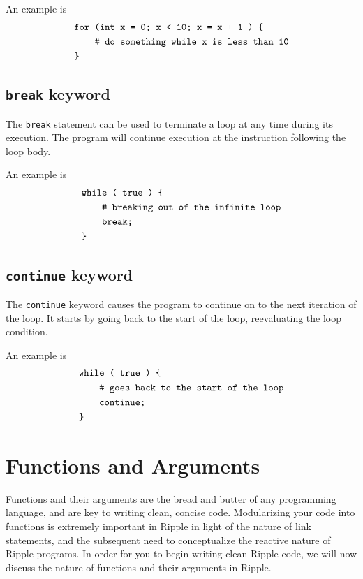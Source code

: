 \documentclass{article}
\newcommand{\code}{\texttt}
\begin{document}
An example is
\begin{align*}
&\code{for (int x = 0; x < 10; x = x + 1 ) \{}         \\
&\code{\qquad \# do something while x is less than 10} \\
&\code{\}}
\end{align*}

\subsection{\code{break} keyword}
The \code{break} statement can be used to terminate a loop at any time during its execution. The program will continue execution at the instruction following the loop body.

An example is
\begin{align*}
&\code{while ( true ) \{}                           \\
&\code{\qquad \# breaking out of the infinite loop} \\
&\code{\qquad break;}                               \\
&\code{\}}
\end{align*}

\subsection{\code{continue} keyword}
The \code{continue} keyword causes the program to continue on to the next iteration of the loop. It starts by going back to the start of the loop, reevaluating the loop condition.

An example is
\begin{align*}
&\code{while ( true ) \{}                            \\
&\code{\qquad \# goes back to the start of the loop} \\
&\code{\qquad continue;}                             \\
&\code{\}}
\end{align*}

\section{Functions and Arguments}

Functions and their arguments are the bread and butter of any programming language, and are key to writing clean, concise code. Modularizing your code into functions is extremely important in Ripple in light of the nature of link statements, and the subsequent need to conceptualize the reactive nature of Ripple programs. In order for you to begin writing clean Ripple code, we will now discuss the nature of functions and their arguments in Ripple. 
\end{document}
